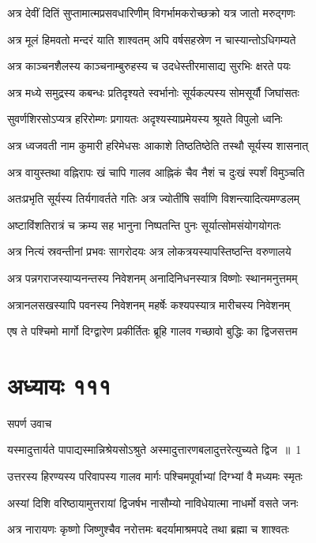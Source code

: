 \twolineshloka
{अत्र देवीं दितिं सुप्तामात्मप्रसवधारिणीम्}
{विगर्भामकरोच्छक्रो यत्र जातो मरुद्गणः}


\twolineshloka
{अत्र मूलं हिमवतो मन्दरं याति शाश्वतम्}
{अपि वर्षसहस्रेण न चास्यान्तोऽधिगम्यते}


\twolineshloka
{अत्र काञ्चनशैलस्य काञ्चनाम्बुरुहस्य च}
{उदधेस्तीरमासाद्य सुरभिः क्षरते पयः}


\twolineshloka
{अत्र मध्ये समुद्रस्य कबन्धः प्रतिदृश्यते}
{स्वर्भानोः सूर्यकल्पस्य सोमसूर्यौ जिघांसतः}


\twolineshloka
{सुवर्णशिरसोऽप्यत्र हरिरोम्णः प्रगायतः}
{अदृश्यस्याप्रमेयस्य श्रूयते विपुलो ध्वनिः}


\twolineshloka
{अत्र ध्वजवती नाम कुमारी हरिमेधसः}
{आकाशे तिष्ठतिष्ठेति तस्थौ सूर्यस्य शासनात्}


\twolineshloka
{अत्र वायुस्तथा वह्निरापः खं चापि गालव}
{आह्निकं चैव नैशं च दुःखं स्पर्शं विमुञ्चति}


\twolineshloka
{अतःप्रभृति सूर्यस्य तिर्यगावर्तते गतिः}
{अत्र ज्योतींषि सर्वाणि विशन्त्यादित्यमण्डलम्}


\twolineshloka
{अष्टाविंशतिरात्रं च क्रम्य सह भानुना}
{निष्पतन्ति पुनः सूर्यात्सोमसंयोगयोगतः}


\twolineshloka
{अत्र नित्यं स्रवन्तीनां प्रभवः सागरोदयः}
{अत्र लोकत्रयस्यापस्तिष्ठन्ति वरुणालये}


\twolineshloka
{अत्र पन्नगराजस्याप्यनन्तस्य निवेशनम्}
{अनादिनिधनस्यात्र विष्णोः स्थानमनुत्तमम्}


\twolineshloka
{अत्रानलसखस्यापि पवनस्य निवेशनम्}
{महर्षेः कश्यपस्यात्र मारीचस्य निवेशनम्}


\twolineshloka
{एष ते पश्चिमो मार्गो दिग्द्वारेण प्रकीर्तितः}
{ब्रूहि गालव गच्छावो बुद्धिः का द्विजसत्तम}


\chapter{अध्यायः १११}
\twolineshloka
{सपर्ण उवाच}
{}


\twolineshloka
{यस्मादुत्तार्यते पापाद्यस्मान्निश्रेयसोऽश्रुते}
{अस्मादुत्तारणबलादुत्तरेत्युच्यते द्विज ॥ 1}


\twolineshloka
{उत्तरस्य हिरण्यस्य परिवापस्य गालव}
{मार्गः पश्चिमपूर्वाभ्यां दिग्भ्यां वै मध्यमः स्मृतः}


\twolineshloka
{अस्यां दिशि वरिष्ठायामुत्तरायां द्विजर्षभ}
{नासौम्यो नाविधेयात्मा नाधर्मो वसते जनः}


\twolineshloka
{अत्र नारायणः कृष्णो जिष्णुश्चैव नरोत्तमः}
{बदर्यामाश्रमपदे तथा ब्रह्मा च शाश्वतः}



